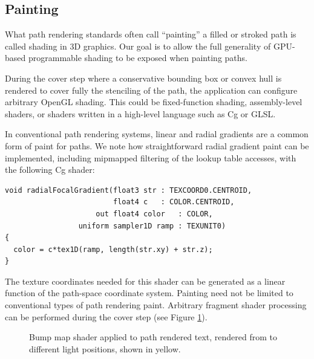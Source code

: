 \subsection{Painting}

What path rendering standards often call ``painting'' a filled or stroked
path is called shading in 3D graphics.  Our goal is to allow the full
generality of GPU-based programmable shading to be exposed when painting
paths.

During the cover step where a conservative bounding box or convex hull
is rendered to cover fully the stenciling of the path, the application
can configure arbitrary OpenGL shading.  This could be fixed-function
shading, assembly-level shaders, or shaders written in a high-level
language such as Cg or GLSL.

In conventional path rendering systems, linear and radial gradients are
a common form of paint for paths.  We note how straightforward radial
gradient paint can be implemented, including mipmapped filtering of the
lookup table accesses, with the following Cg shader:
\begin{lstlisting}
void radialFocalGradient(float3 str : TEXCOORD0.CENTROID,
                         float4 c   : COLOR.CENTROID,
                     out float4 color   : COLOR,
                 uniform sampler1D ramp : TEXUNIT0)
{
  color = c*tex1D(ramp, length(str.xy) + str.z);
}
\end{lstlisting}
The texture coordinates needed for this shader can be generated as a
linear function of the path-space coordinate system.
Painting need not be limited to conventional types of path rendering
paint.  Arbitrary fragment shader processing can be performed during
the cover step (see Figure \ref{fig:bumpmap}).

\begin{figure}[tb]
  \caption{\label{fig:bumpmap} Bump map shader applied to path rendered
  text, rendered from to different light positions, shown in yellow.}
\end{figure}


